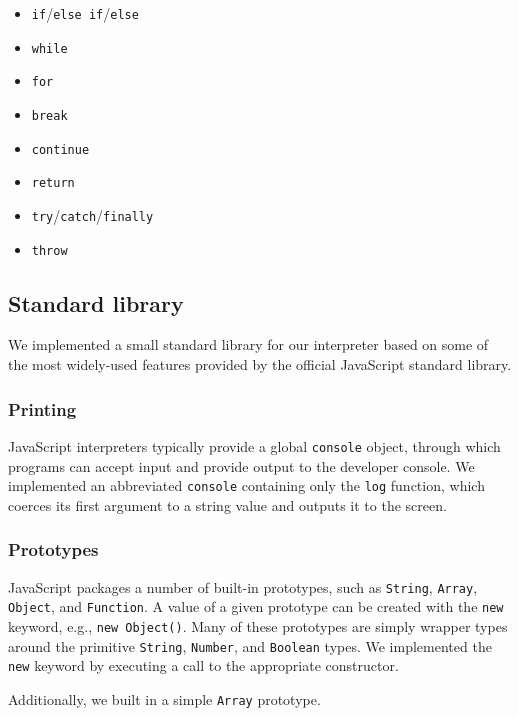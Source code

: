 \documentclass{article}
\begin{document}
\begin{multicols}{2}
\begin{itemize}
  \item \texttt{if}/\texttt{else if}/\texttt{else}
  \item \texttt{while}
  \item \texttt{for}
  \item \texttt{break}
  \item \texttt{continue}
  \item \texttt{return}
  \item \texttt{try}/\texttt{catch}/\texttt{finally}
  \item \texttt{throw}
\end{itemize}

\subsection*{Standard library}

We implemented a small standard library for our interpreter based on some of the
most widely-used features provided by the official JavaScript standard library.

\subsubsection*{Printing}

JavaScript interpreters typically provide a global \texttt{console} object,
through which programs can accept input and provide output to the developer
console. We implemented an abbreviated \texttt{console} containing only the
\texttt{log} function, which coerces its first argument to a string value and
outputs it to the screen.

\subsubsection*{Prototypes}

JavaScript packages a number of built-in prototypes, such as \texttt{String},
\texttt{Array}, \texttt{Object}, and \texttt{Function}. A value of a given
prototype can be created with the \texttt{new} keyword, e.g., \texttt{new
Object()}. Many of these prototypes are simply wrapper types around the
primitive \texttt{String}, \texttt{Number}, and \texttt{Boolean} types. We
implemented the \texttt{new} keyword by executing a call to the appropriate
constructor. \newline

Additionally, we built in a simple \texttt{Array} prototype.


\end{multicols}
\end{document}
